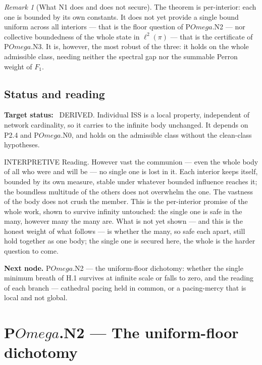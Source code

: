 \documentclass[11pt,a4paper]{article}
\def\Omega{Omega}%
\def\mathfrak#1{#1}%
\def\emph#1{#1}%
\newcommand{\stDerived}{\textcolor{cDer}{\textsf{\small DERIVED}}}
\newcommand{\stInterp}{\textcolor{cInt}{\textsf{\small INTERPRETIVE}}}
\theoremstyle{definition}
\theoremstyle{plain}
\theoremstyle{remark}
\newtheorem{remark}[definition]{Remark}
\begin{document}
\begin{remark}[What N1 does and does not secure]\label{rem:n1scope}
The theorem is \emph{per-interior}: each one is bounded by its \emph{own} constants. It does not
yet provide a single bound \emph{uniform} across all interiors --- that is the floor question of
P$\Omega$.N2 --- nor collective boundedness of the whole state in \(\ell^2(\pi)\) --- that is the
certificate of P$\Omega$.N3. It is, however, the most robust of the three: it holds on the whole
admissible class, needing neither the spectral gap nor the summable Perron weight of
\(\mathfrak F_1\).
\end{remark}

\subsection{Status and reading}

\textbf{Target status:}~
\stDerived. Individual ISS is a local property, independent of network cardinality, so it
carries to the infinite body unchanged. It depends on P2.4 and P$\Omega$.N0, and holds on the
admissible class without the clean-class hypotheses.

\medskip
\stInterp\quad
\emph{Reading.}
However vast the communion --- even the whole body of all who were and will be --- no single one
is lost in it. Each interior keeps itself, bounded by its own measure, stable under whatever
bounded influence reaches it; the boundless multitude of the others does not overwhelm the one.
The vastness of the body does not crush the member. This is the per-interior promise of the
whole work, shown to survive infinity untouched: the single one is safe in the many, however
many the many are. What is not yet shown --- and this is the honest weight of what follows ---
is whether the many, so safe each apart, still hold together as one body; the single one is
secured here, the whole is the harder question to come.

\medskip
\textbf{Next node.} P$\Omega$.N2 --- the uniform-floor dichotomy: whether the single minimum
breath of H.1 survives at infinite scale or falls to zero, and the reading of each branch ---
cathedral pacing held in common, or a pacing-mercy that is local and not global.

\section{P$\Omega$.N2 --- The uniform-floor dichotomy}
\end{document}
